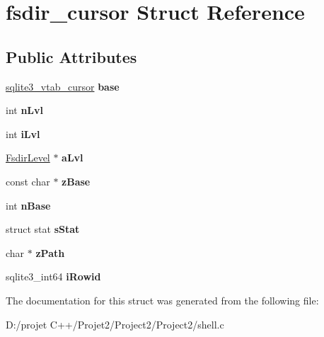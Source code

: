 \hypertarget{structfsdir__cursor}{}\section{fsdir\+\_\+cursor Struct Reference}
\label{structfsdir__cursor}
\subsection*{Public Attributes}
\begin{DoxyCompactItemize}
\item 
\mbox{\label{structfsdir__cursor_ad975d6fcacb341de5c8e4c90a22fe795}} 
\mbox{\hyperlink{structsqlite3__vtab__cursor}{sqlite3\+\_\+vtab\+\_\+cursor}} {\bfseries base}
\item 
\mbox{\label{structfsdir__cursor_a69f2d7a987c7e20fd0903247082f16fc}} 
int {\bfseries n\+Lvl}
\item 
\mbox{\label{structfsdir__cursor_a2d0359470075292d6f96e42a4afbffc5}} 
int {\bfseries i\+Lvl}
\item 
\mbox{\label{structfsdir__cursor_af716a255c7290e71f25462a377e7b7be}} 
\mbox{\hyperlink{struct_fsdir_level}{Fsdir\+Level}} $\ast$ {\bfseries a\+Lvl}
\item 
\mbox{\label{structfsdir__cursor_ac2270e2507c56e0b6bdcc94a11e880ef}} 
const char $\ast$ {\bfseries z\+Base}
\item 
\mbox{\label{structfsdir__cursor_ad58c8326427032278ba2a4546d1a6741}} 
int {\bfseries n\+Base}
\item 
\mbox{\label{structfsdir__cursor_ad16935c34680a414a9443221e53b1247}} 
struct stat {\bfseries s\+Stat}
\item 
\mbox{\label{structfsdir__cursor_a219ea79c7473ba38da3cd762e716e16f}} 
char $\ast$ {\bfseries z\+Path}
\item 
\mbox{\label{structfsdir__cursor_afb49dc8515626a46c982372fe1c84995}} 
sqlite3\+\_\+int64 {\bfseries i\+Rowid}
\end{DoxyCompactItemize}


The documentation for this struct was generated from the following file\+:\begin{DoxyCompactItemize}
\item 
D\+:/projet C++/\+Projet2/\+Project2/\+Project2/shell.\+c\end{DoxyCompactItemize}
